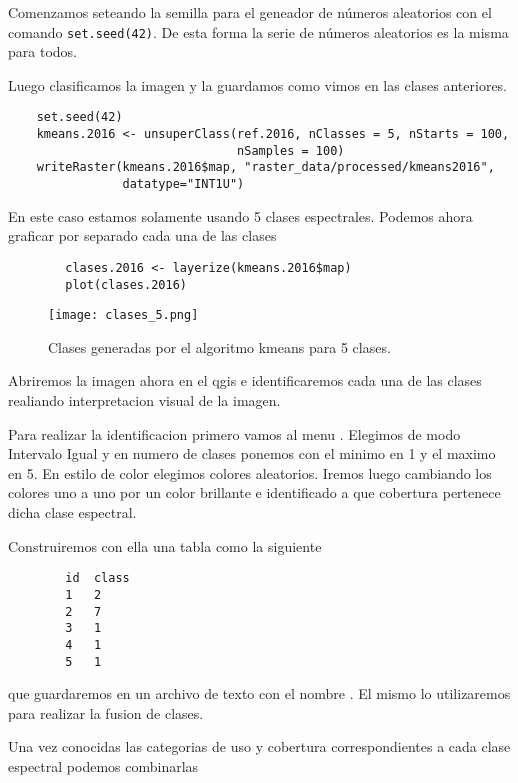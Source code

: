 \begin{exa}
    Comenzamos seteando la semilla para el geneador de n\'umeros aleatorios con el
    comando \texttt{set.seed(42)}. De esta forma la serie de n\'umeros aleatorios
    es la misma para todos.

    Luego clasificamos la imagen y la guardamos como vimos en las clases anteriores.
    \begin{lstlisting}
    set.seed(42)
    kmeans.2016 <- unsuperClass(ref.2016, nClasses = 5, nStarts = 100,
                                nSamples = 100)
    writeRaster(kmeans.2016$map, "raster_data/processed/kmeans2016",
                datatype="INT1U")
    \end{lstlisting}

    En este caso estamos solamente usando 5 clases espectrales. Podemos ahora graficar por separado cada una de las clases
    \begin{lstlisting}
        clases.2016 <- layerize(kmeans.2016$map)
        plot(clases.2016)
    \end{lstlisting}
    \begin{figure}
      \texttt{[image: clases\_5.png]}
      \caption{Clases generadas por el algoritmo kmeans para 5 clases.}
      \label{fig:clases5}
    \end{figure}
    Abriremos la imagen ahora en el qgis e identificaremos cada una de las clases realiando interpretacion visual de la imagen.

    Para realizar la identificacion primero vamos al menu . Elegimos de modo
    Intervalo Igual y en numero de clases ponemos con el minimo en 1 y el maximo en
    5. En estilo de color elegimos colores aleatorios. Iremos luego cambiando los
    colores uno a uno por un color brillante e identificado a que cobertura
    pertenece dicha clase espectral.

    Construiremos con ella una tabla como la siguiente

    \begin{verbatim}
        id  class
        1   2
        2   7
        3   1
        4   1
        5   1
    \end{verbatim}

  que guardaremos en un archivo de texto con el nombre . El mismo lo utilizaremos para realizar
  la fusion de clases.

  Una vez conocidas las categorias de uso y cobertura correspondientes a cada
  clase espectral podemos combinarlas


\end{exa}
